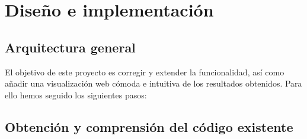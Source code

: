 \documentclass[a4paper, 12pt]{book}
\begin{document}





\cleardoublepage
\chapter{Diseño e implementación}
\label{sec:diseno}

\section{Arquitectura general} 
\label{sec:arquitectura}

El objetivo de este proyecto es corregir y extender la funcionalidad, así como añadir una visualización web cómoda e intuitiva de los resultados obtenidos. Para ello hemos seguido los siguientes pasos:

\section{Obtención y comprensión del código existente}
\end{document}
